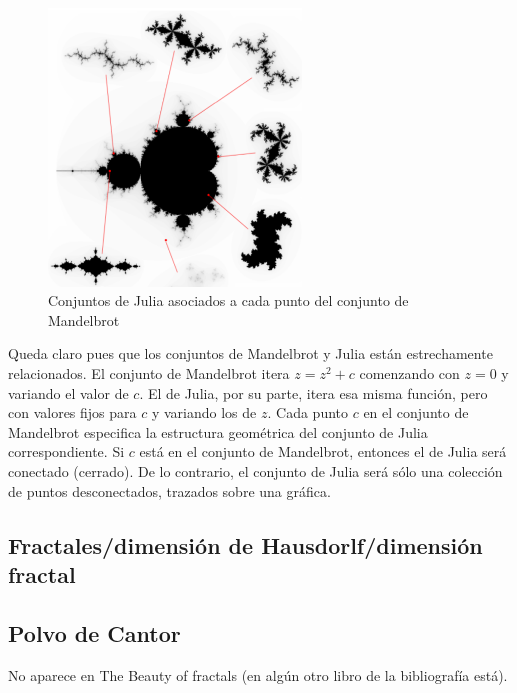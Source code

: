 \begin{figure}[hbtp]
\centering
\includegraphics[width = 0.6\textwidth]{img/Mandelbrot-Julia.png}
\caption{Conjuntos de Julia asociados a cada punto del conjunto de Mandelbrot}
\label{fig:Mandelbrot-Julia}
\end{figure}

Queda claro pues que los conjuntos de Mandelbrot y Julia están estrechamente relacionados. El conjunto de Mandelbrot itera $z=z^2+c$ comenzando con $z = 0$ y variando el valor de $c$. El de Julia, por su parte, itera esa misma función, pero con valores fijos para $c$ y variando los de $z$. Cada punto $c$ en el conjunto de Mandelbrot especifica la estructura geométrica del conjunto de Julia correspondiente. Si $c$ está en el conjunto de Mandelbrot, entonces el de Julia será conectado (cerrado). De lo contrario, el conjunto de Julia será sólo una colección de puntos desconectados, trazados sobre una gráfica.

\subsection{Fractales/dimensión de Hausdorlf/dimensión fractal}
\subsection{Polvo de Cantor} No aparece en The Beauty of fractals (en algún otro libro de la bibliografía está).


